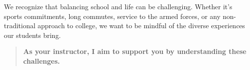 \documentclass{ximera}
\author{Bart Snapp}
\begin{document}
\begin{question}
We recognize that balancing school and life can be challenging. Whether it's
sports commitments, long commutes, service to the armed forces, or any
non-traditional approach to college, we want to be mindful of the diverse
experiences our students bring.

\begin{quote}
\textbf{As your instructor, I aim to support you by understanding these challenges.} 
\end{quote}
\begin{freeResponse}
\end{freeResponse}
\end{question}
\end{document}

